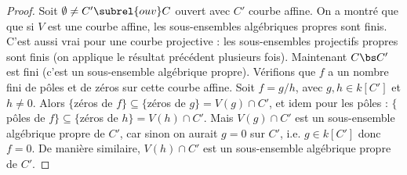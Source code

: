             \begin{proof}
                Soit $\emptyset \neq C' \subrel{ouv} C$ ouvert avec $C'$ courbe affine. On a montré que que si $V$ est une courbe affine, les sous-ensembles algébriques propres sont finis. C'est aussi vrai pour une courbe projective  : les sous-ensembles projectifs propres sont finis (on applique le résultat précédent plusieurs fois). Maintenant $C \bs C'$ est fini (c'est un  sous-ensemble algébrique  propre). Vérifions que $f$ a un nombre fini de pôles et de zéros sur cette courbe affine. Soit $f = g/h$, avec $g,h \in k[C']$ et $h \neq 0$. Alors $\{$zéros de $f\} \subseteq \{$zéros de $g\} = V(g) \cap C'$, et idem pour les pôles : $\{$pôles de $f\} \subseteq \{$zéros de $h\} = V(h) \cap C'$. Mais $V(g) \cap C'$ est un sous-ensemble algébrique propre de $C'$, car sinon on aurait $g = 0$ sur $C'$, i.e. $g \in k[C']$ donc $f = 0$. De manière similaire, $V(h) \cap C'$ est un sous-ensemble algébrique propre de $C'$.
            \end{proof}

